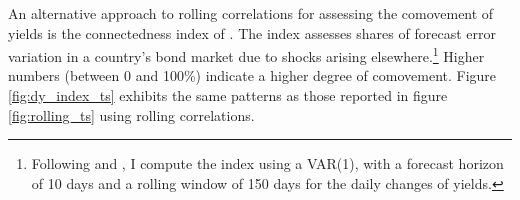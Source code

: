 \begin{appendices}


An alternative approach to rolling correlations for assessing the comovement of yields is the connectedness index of \cite{DieboldYilmaz:2014}. 
The index assesses shares of forecast error variation in a country's bond market due to shocks arising elsewhere.\footnote{ Following \cite{ACDM:2019} and \cite{BostanciYilmaz:2020}, I compute the index  using a VAR(1), with a forecast horizon of 10 days and a rolling window of 150 days for the daily changes of yields.} %
Higher numbers (between 0 and 100\%) indicate a higher degree of comovement. 
Figure \ref{fig:dy_index_ts} exhibits the same patterns as those reported in figure \ref{fig:rolling_ts} using rolling correlations.


\end{appendices}
